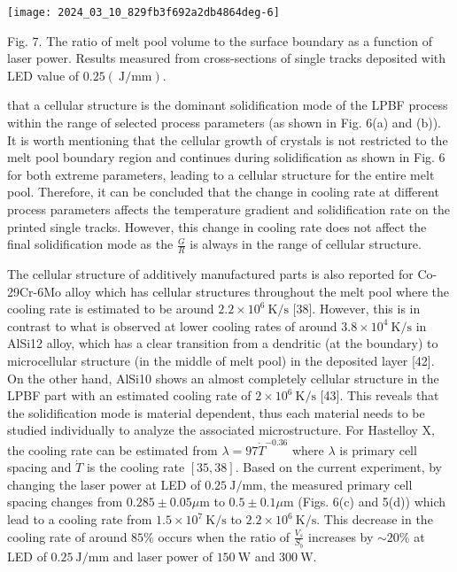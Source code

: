 \documentclass[10pt]{article}
\begin{document}
\begin{center}
\texttt{[image: 2024\_03\_10\_829fb3f692a2db4864deg-6]}
\end{center}

Fig. 7. The ratio of melt pool volume to the surface boundary as a function of laser power. Results measured from cross-sections of single tracks deposited with LED value of $0.25(\mathrm{~J} / \mathrm{mm})$.

that a cellular structure is the dominant solidification mode of the LPBF process within the range of selected process parameters (as shown in Fig. 6(a) and (b)). It is worth mentioning that the cellular growth of crystals is not restricted to the melt pool boundary region and continues during solidification as shown in Fig. 6 for both extreme parameters, leading to a cellular structure for the entire melt pool. Therefore, it can be concluded that the change in cooling rate at different process parameters affects the temperature gradient and solidification rate on the printed single tracks. However, this change in cooling rate does not affect the final solidification mode as the $\frac{G}{R}$ is always in the range of cellular structure.

The cellular structure of additively manufactured parts is also reported for Co-29Cr-6Mo alloy which has cellular structures throughout the melt pool where the cooling rate is estimated to be around $2.2 \times 10^{6} \mathrm{~K} / \mathrm{s}$ [38]. However, this is in contrast to what is observed at lower cooling rates of around $3.8 \times 10^{4} \mathrm{~K} / \mathrm{s}$ in AlSi12 alloy, which has a clear transition from a dendritic (at the boundary) to microcellular structure (in the middle of melt pool) in the deposited layer [42]. On the other hand, AlSi10 shows an almost completely cellular structure in the LPBF part with an estimated cooling rate of $2 \times 10^{6} \mathrm{~K} / \mathrm{s}$ [43]. This reveals that the solidification mode is material dependent, thus each material needs to be studied individually to analyze the associated microstructure. For Hastelloy X, the cooling rate can be estimated from $\lambda=97 \dot{T}^{-0.36}$ where $\lambda$ is primary cell spacing and $\dot{T}$ is the cooling rate $[35,38]$. Based on the current experiment, by changing the laser power at LED of $0.25 \mathrm{~J} / \mathrm{mm}$, the measured primary cell spacing changes from $0.285 \pm 0.05 \mu \mathrm{m}$ to $0.5 \pm 0.1 \mu \mathrm{m}$ (Figs. 6(c) and 5(d)) which lead to a cooling rate from $1.5 \times 10^{7} \mathrm{~K} / \mathrm{s}$ to $2.2 \times 10^{6} \mathrm{~K} / \mathrm{s}$. This decrease in the cooling rate of around $85 \%$ occurs when the ratio of $\frac{V_{s}}{S_{b}}$ increases by $\sim 20 \%$ at LED of $0.25 \mathrm{~J} / \mathrm{mm}$ and laser power of $150 \mathrm{~W}$ and $300 \mathrm{~W}$.
\end{document}
